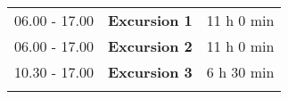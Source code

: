 \begin{longtable}{p{3cm}p{10cm}p{4cm}}
\vspace{1cm}
06.00 - 17.00 & {\bf Excursion 1} & \hfill 11 h 0 min\\ 
\vspace{1cm}
06.00 - 17.00 & {\bf Excursion 2} & \hfill 11 h 0 min\\ 
\vspace{1cm}
10.30 - 17.00 & {\bf Excursion 3} & \hfill 6 h 30 min\\ 
\vspace{1cm}
\end{longtable}

